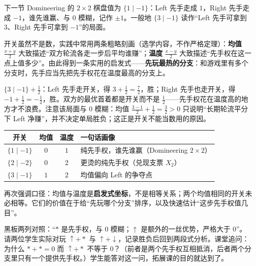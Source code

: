 \begin{example}[开关的两端]\label{ex:switch}
下一节 Domineering 的 $2\times2$ 棋盘值为 $\{1\mid -1\}$：Left 先手走成 $1$，Right 先手走成 $-1$，谁先谁赢、与 $0$ 模糊，记作 $\pm1$。一般地 $\{3\mid -1\}$ 读作“Left 先手可拿到 $3$、Right 先手可拿到 $-1$”的局面。
\end{example}

开关虽然不是数，实践中常用两条粗略刻画（选学内容，不作严格定理）：\textbf{均值} $\tfrac{x+y}{2}$ 大致描述“双方轮流各走一步后平均谁赚”；\textbf{温度} $\tfrac{x-y}{2}$ 大致描述“先手权在这一点上值多少”。由此得到一条实用的启发式——\textbf{先玩最热的分支}：和游戏里有多个分支时，先手应当先把先手权花在温度最高的分支上。

\begin{example}[先玩最热]\label{ex:hotstrat}
$\{3\mid -1\}+\tfrac12$：Left 先手走开关，得 $3+\tfrac12=\tfrac72$，胜；Right 先手也走开关，得 $-1+\tfrac12=-\tfrac12$，胜。双方的最优首着都是开关而不是 $\tfrac12$——先手权花在温度高的地方才不浪费。注意该局面与 $0$ 模糊：均值 $\tfrac{3-1}{2}+ \tfrac12=\tfrac32>0$ 只说明“长期轮流平分下 Left 净赚”，并不决定单局胜负；这正是开关不能当数用的原因。
\end{example}

\begin{center}
\begin{tabular}{cccl}
\toprule
开关 & 均值 & 温度 & 一句话画像\\
\midrule
$\{1\mid -1\}$ & $0$ & $1$ & 纯先手权，谁先谁赢（Domineering $2\times2$）\\
$\{2\mid -2\}$ & $0$ & $2$ & 更烫的纯先手权（兑现支票 $X_2$）\\
$\{3\mid -1\}$ & $1$ & $2$ & 均值偏向 Left 的争夺点\\
\bottomrule
\end{tabular}
\end{center}

再次强调口径：均值与温度是\textbf{启发式坐标}，不是相等关系；两个均值相同的开关未必相等。它们的价值在于给“先玩哪个分支”排序，以及快速估计“这步先手权值几目”。

\begin{teach}[微小值的课堂演示]
黑板两列对照：“$\ast$ 是先手权，与 $0$ 模糊；$\uparrow$ 是额外的一丝优势，严格大于 $0$”。请两位学生实际对玩 $\uparrow+\ast$ 与 $\uparrow+\downarrow$，记录胜负后回到两段式分析。课堂追问：为什么 $\ast+\ast=0$ 而 $\uparrow+\ast$ 不等于 $0$？（前者是两个先手权互相抵消，后者两个分支里只有一个提供先手权。）学生能答对这一问，拓展课的目的就达到了。
\end{teach}
